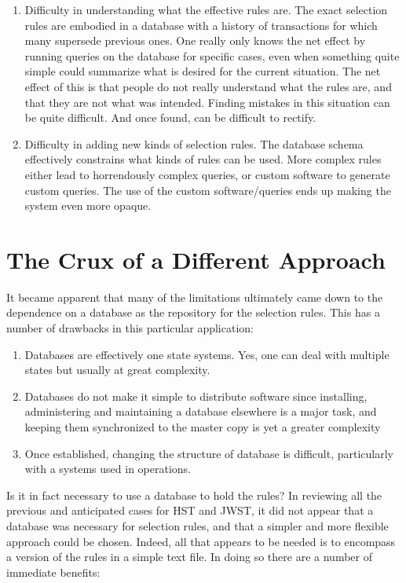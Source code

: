 \documentclass[final,authoryear,5p,times,twocolumn]{elsarticle}
\begin{document}
\begin{enumerate}
\item Difficulty in understanding what the effective rules are. The exact
selection rules are embodied in a database with a history of transactions for
which many supersede previous ones. One really only knows the net effect by
running queries on the database for specific cases, even when something quite
simple could summarize what is desired for the current situation. The net
effect of this is that people do not really understand what the rules are, and
that they are not what was intended. Finding mistakes in this situation can be
quite difficult. And once found, can be difficult to rectify.

\item Difficulty in adding new kinds of selection rules. The database schema
effectively constrains what kinds of rules can be used. More complex rules
either lead to horrendously complex queries, or custom software to generate
custom queries. The use of the custom software/queries ends up making the system
even more opaque.
\end{enumerate}

\section{The Crux of a Different Approach}

It became apparent that many of the limitations ultimately came down to the
dependence on a database as the repository for the selection rules. This has a
number of drawbacks in this particular application:

\begin{enumerate}
\item Databases are effectively one state systems. Yes, one can deal with
multiple states but usually at great complexity.
\item Databases do not make it simple to distribute software since installing,
administering and maintaining a database elsewhere is a major task, and keeping
them synchronized to the master copy is yet a greater complexity
\item Once established, changing the structure of database is difficult,
particularly with a systems used in operations.
\end{enumerate}

Is it in fact necessary to use a database to hold the rules? In reviewing all
the previous and anticipated cases for HST and JWST, it did not appear that a
database was necessary for selection rules, and that a simpler and more
flexible approach could be chosen. Indeed, all that appears to be needed is to
encompass a version of the rules in a simple text file. In doing so there are a
number of immediate benefits:
\end{document}

